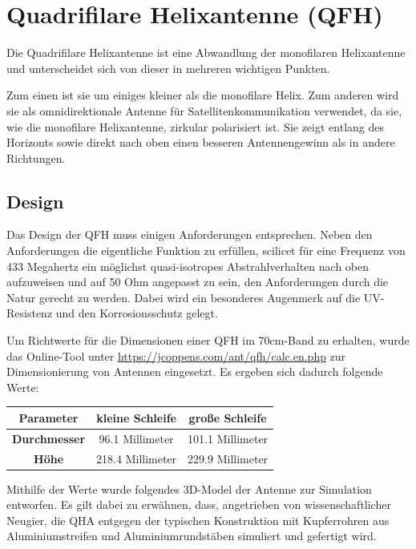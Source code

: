 \chapter{Quadrifilare Helixantenne (QFH)}
\label{chap:qfh}
Die Quadrifilare Helixantenne ist eine Abwandlung der monofilaren Helixantenne und unterscheidet sich von dieser in mehreren wichtigen Punkten.

Zum einen ist sie um einiges kleiner als die monofilare Helix. Zum anderen wird sie als omnidirektionale Antenne für Satellitenkommunikation verwendet, da sie, wie die monofilare Helixantenne, zirkular polarisiert ist. Sie zeigt entlang des Horizonts sowie direkt nach oben einen besseren Antennengewinn als in andere Richtungen.

\section{Design}
Das Design der QFH muss einigen Anforderungen entsprechen. Neben den Anforderungen die eigentliche Funktion zu erfüllen, scilicet für eine Frequenz von 433 Megahertz ein möglichst quasi-isotropes Abstrahlverhalten nach oben aufzuweisen und auf 50 Ohm angepasst zu sein, den Anforderungen durch die Natur gerecht zu werden. Dabei wird ein besonderes Augenmerk auf die UV-Resistenz und den Korrosionsschutz gelegt. 

Um Richtwerte für die Dimensionen einer QFH im 70cm-Band zu erhalten, wurde das Online-Tool unter \url{https://jcoppens.com/ant/qfh/calc.en.php} zur Dimensionierung von Antennen eingesetzt. Es ergeben sich dadurch folgende Werte:

\begin{center}
\begin{tabular}{|c|c|c|}
	\hline
	\textbf{Parameter} & \textbf{kleine Schleife} & \textbf{große Schleife} \\
	\hline
	\textbf{Durchmesser} & 96.1 Millimeter & 101.1 Millimeter \\
	\hline
	\textbf{Höhe} & 218.4 Millimeter & 229.9 Millimeter \\
	\hline
\end{tabular}
\end{center}

Mithilfe der Werte wurde folgendes 3D-Model der Antenne zur Simulation entworfen. Es gilt dabei zu erwähnen, dass, angetrieben von wissenschaftlicher Neugier, die QHA entgegen der typischen Konstruktion mit Kupferrohren aus Aluminiumstreifen und Aluminiumrundstäben simuliert und gefertigt wird. 

